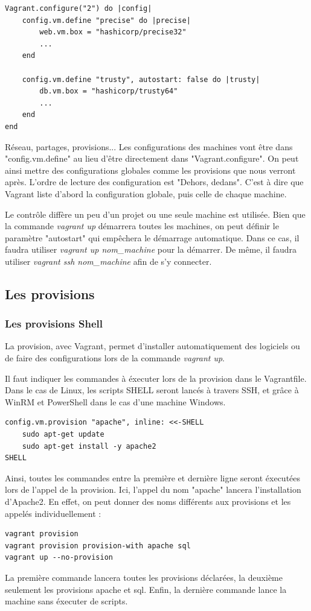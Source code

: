 \documentclass[12pt,a4paper]{article}
\begin{document}
\begin{lstlisting}
Vagrant.configure("2") do |config|
	config.vm.define "precise" do |precise|
		web.vm.box = "hashicorp/precise32"
		...
	end
	
	config.vm.define "trusty", autostart: false do |trusty|
		db.vm.box = "hashicorp/trusty64"
		...
	end
end
\end{lstlisting}
Réseau, partages, provisions... Les configurations des machines vont être dans "config.vm.define" au lieu d'être directement dans "Vagrant.configure". On peut ainsi mettre des configurations globales comme les provisions que nous verront après. L'ordre de lecture des configuration est "Dehors, dedans". C'est à dire que Vagrant liste d'abord la configuration globale, puis celle de chaque machine.

	Le contrôle diffère un peu d'un projet ou une seule machine est utilisée. Bien que la commande \textit{vagrant up} démarrera toutes les machines, on peut définir le paramètre "autostart" qui empêchera le démarrage automatique. Dans ce cas, il faudra utiliser \textit{vagrant up nom\_machine} pour la démarrer. De même, il faudra utiliser \textit{vagrant ssh nom\_machine} afin de s'y connecter.

\subsection{Les provisions}

\subsubsection{Les provisions Shell}
La provision, avec Vagrant, permet d'installer automatiquement des logiciels ou de faire des configurations lors de la commande \textit{vagrant up}. 

Il faut indiquer les commandes à éxecuter lors de la provision dans le Vagrantfile. Dans le cas de Linux, les scripts SHELL seront lancés à travers SSH, et grâce à WinRM et PowerShell dans le cas d'une machine Windows.
\begin{lstlisting}
config.vm.provision "apache", inline: <<-SHELL
	sudo apt-get update
	sudo apt-get install -y apache2
SHELL
\end{lstlisting}
Ainsi, toutes les commandes entre la première et dernière ligne seront éxecutées lors de l'appel de la provision. Ici, l'appel du nom "apache" lancera l'installation d'Apache2. En effet, on peut donner des noms différents aux provisions et les appelés individuellement :
\begin{lstlisting}
vagrant provision
vagrant provision provision-with apache sql  
vagrant up --no-provision
\end{lstlisting}
La première commande lancera toutes les provisions déclarées, la deuxième seulement les provisions apache et sql. Enfin, la dernière commande lance la machine sans éxecuter de scripts.
\end{document}
